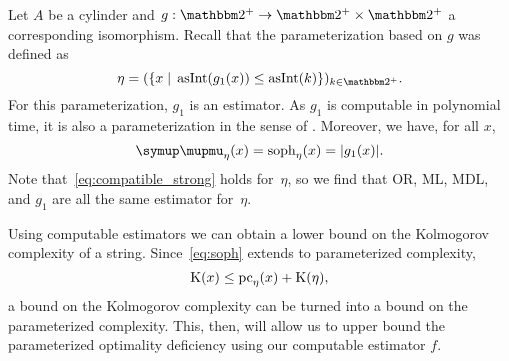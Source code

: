 \begin{example}
  Let $A$ be a \pdash{}cylinder and $g : \binary^+ \to \binary^+ \times \binary^+$ a corresponding isomorphism.
  Recall that the parameterization based on $g$ was defined as
  \begin{equation*}
    \eta \deq (\{x \st \asNat(g_1(x)) \le \asNat(k)\})_{k \in \binary^+}.
  \end{equation*}
  For this parameterization, $g_1$ is an estimator.
  As $g_1$ is computable in polynomial time, it is also a parameterization in the sense of \citeauthor{flum2006parameterized}.
  Moreover, we have, for all $x$,
  \begin{equation*}
    \mu_\eta(x) = \soph_\eta(x) = \length{g_1(x)}.
  \end{equation*}
  Note that~\eqref{eq:compatible_strong} holds for~$\eta$, so we find that OR, ML, MDL, and $g_1$ are all the same estimator for~$\eta$.
\end{example}

Using computable estimators we can obtain a lower bound on the Kolmogorov complexity of a string.
Since~\eqref{eq:soph} extends to parameterized complexity,
\begin{equation}
\label{eq:kclepc}
  \operatorname{K}(x) \le \operatorname{pc}_\eta(x) + \operatorname{K}(\eta),
\end{equation}
a bound on the Kolmogorov complexity can be turned into a bound on the parameterized complexity.
This, then, will allow us to upper bound the parameterized optimality deficiency using our computable estimator $f$.

